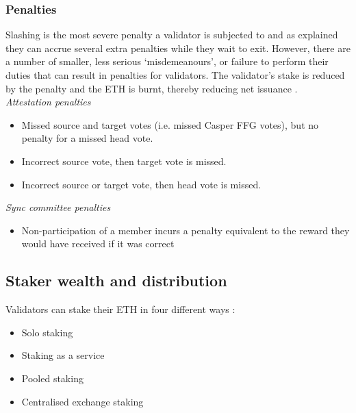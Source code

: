 \documentclass[UTF8]{article}
\begin{document}
\subsubsection*{Penalties}
Slashing is the most severe penalty a validator is subjected to and as explained they can accrue several extra penalties while they wait to exit. However, there are a number of smaller, less serious `misdemeanours', or failure to perform their duties that can result in penalties for validators. The validator's stake is reduced by the penalty and the ETH is burnt, thereby reducing net issuance \cite{Edgington2023}. \\

\textit{Attestation penalties}
\begin{itemize}
\item Missed source and target votes (i.e. missed Casper FFG votes), but no penalty for a missed head vote.
\item Incorrect source vote, then target vote is missed.
\item Incorrect source or target vote, then head vote is missed.
\end{itemize}

\textit{Sync committee penalties}
\begin{itemize}
\item Non-participation of a member incurs a penalty equivalent to the reward they would have received if it was correct
\end{itemize}

\subsection{Staker wealth and distribution}
Validators can stake their ETH in four different ways \cite{breslina}:
\begin{itemize}
\item Solo staking 
\item Staking as a service
\item Pooled staking
\item Centralised exchange staking
\end{itemize}
\end{document}
